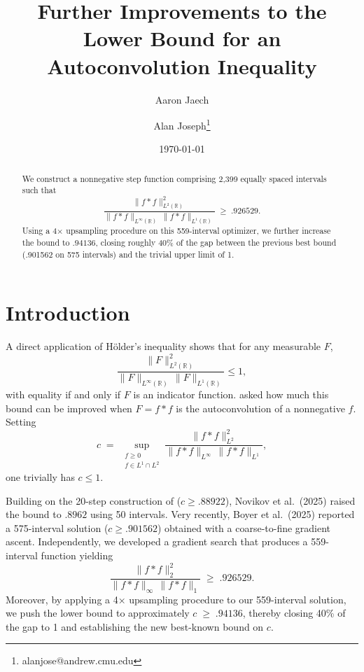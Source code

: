 \documentclass[11pt]{article}
\theoremstyle{definition}
\theoremstyle{remark}
\newcommand{\R}{\mathbb{R}}
\begin{document}

\title{Further Improvements to the Lower Bound for an Autoconvolution Inequality}
\author{%
  Aaron Jaech%
  \and
  Alan Joseph\thanks{alanjose@andrew.cmu.edu}%
}
\date{\today}
\maketitle

\begin{abstract}

We construct a nonnegative step function comprising 2,399 equally spaced intervals such that  
\[
  \frac{\|f * f\|_{L^{2}(\mathbb{R})}^{2}}{\|f * f\|_{L^{\infty}(\mathbb{R})}\,\|f * f\|_{L^{1}(\mathbb{R})}}
  \;\ge\;
  .926529.
\]
Using a 4× upsampling procedure on this 559-interval optimizer, we further increase the bound to $.94136$,
closing roughly 40\% of the gap between the previous best bound (.901562 on 575 intervals) and the trivial upper limit of 1.

\end{abstract}

\section{Introduction}

A direct application of Hölder’s inequality shows that for any measurable \(F\),
\[
  \frac{\|F\|_{L^{2}(\R)}^{2}}{\|F\|_{L^{\infty}(\R)}\,\|F\|_{L^{1}(\R)}} \le 1,
\]
with equality if and only if \(F\) is an indicator function.  \cite{martin2009supremum} asked how much this bound can be improved when \(F = f * f\) is the autoconvolution of a nonnegative \(f\).  Setting
\[
  c \;=\;\sup_{\substack{f\ge0\\f\in L^1\cap L^2}}
    \frac{\|f*f\|_{L^{2}}^{2}}{\|f*f\|_{L^{\infty}}\,\|f*f\|_{L^{1}}},
\]
one trivially has \(c\le1\).  

Building on the 20-step construction of \cite{matolcsi2010improved}
(\(c\ge.88922\)),
Novikov et al.\ (2025) raised the bound to \(.8962\) using
50 intervals. Very recently, Boyer et al.\ (2025) reported a
575-interval solution (\(c\ge.901562\)) obtained with a
coarse-to-fine gradient ascent.  Independently,
we developed a gradient search that produces a 559-interval function yielding
\[
  \frac{\|f*f\|_{2}^{2}}{\|f*f\|_{\infty}\,\|f*f\|_{1}}
  \;\ge\;
  .926529.
\]
Moreover, by applying a 4× upsampling procedure to our 559-interval solution, we push the lower bound to approximately $c \;\ge\; .94136$,
thereby closing 40\% of the gap to 1 and establishing the new best-known bound on 
$c$.
\end{document}
